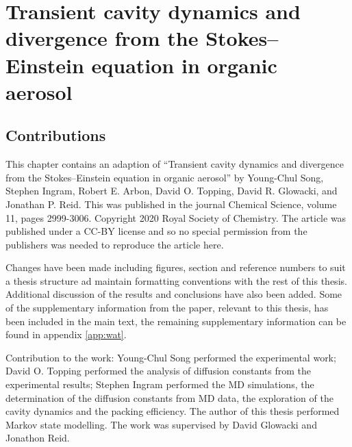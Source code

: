 %
%
\let\textcircled=\pgftextcircled
\chapter{Transient cavity dynamics and divergence from the Stokes–Einstein equation in organic aerosol}
\label{chap:water}


\section{Contributions}

This chapter contains an adaption of ``Transient cavity dynamics and divergence from the Stokes–Einstein equation in organic aerosol'' by Young-Chul Song, Stephen Ingram, Robert E. Arbon, David O. Topping, David R. Glowacki, and Jonathan P. Reid. This was published in the journal Chemical Science, volume 11, pages 2999-3006. Copyright 2020 Royal Society of Chemistry. The article was published under a CC-BY license and so no special permission from the publishers was needed to reproduce the article here.  

Changes have been made including figures, section and reference numbers to suit a thesis structure ad maintain formatting conventions with the rest of this thesis. Additional discussion of the results and conclusions have also been added. Some of the supplementary information from the paper, relevant to this thesis, has  been included in the main text, the remaining supplementary information can be found in appendix \ref{app:wat}. 

Contribution to the work: Young-Chul Song performed the experimental work; David O. Topping performed the analysis of diffusion constants from the experimental results; Stephen Ingram performed the MD simulations, the determination of the diffusion constants from MD data, the exploration of the cavity dynamics and the packing efficiency.  The author of this thesis performed Markov state modelling. The work was supervised by David Glowacki and Jonathon Reid. 

